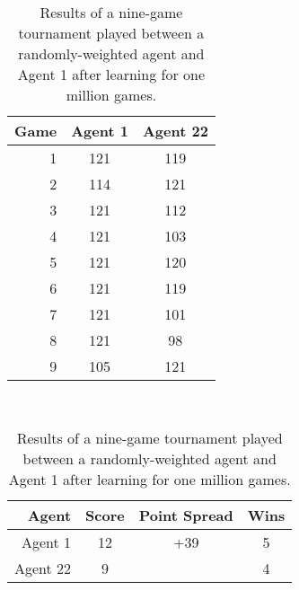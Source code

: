 
\begin{table}
\center
\begin{tabular}{|r|c|c|}
	\hline
	\textbf{Game} & \textbf{Agent 1} & \textbf{Agent 22}\\\hline
	1 & 121 & 119\\\hline
	2 & 114 & 121\\\hline
	3 & 121 & 112\\\hline
	4 & 121 & 103\\\hline
	5 & 121 & 120\\\hline
	6 & 121 & 119\\\hline
	7 & 121 & 101\\\hline
	8 & 121 &  98\\\hline
	9 & 105 & 121\\\hline
\end{tabular}
~
\begin{tabular}{|r|c|c|c|}
	\hline
	\textbf{Agent} & \textbf{Score} & \textbf{Point Spread} & \textbf{Wins}
	\\\hline
	Agent 1 & 12 & +39 & 5
	\\\hline
	Agent 22 & 9 & \textemdash & 4
	\\\hline
\end{tabular}

\caption{
	Results of a nine-game tournament played between
	a randomly-weighted agent
	and
	Agent 1 after learning for one million games.
}

\label{tab_r2-randtourny}

\end{table}
